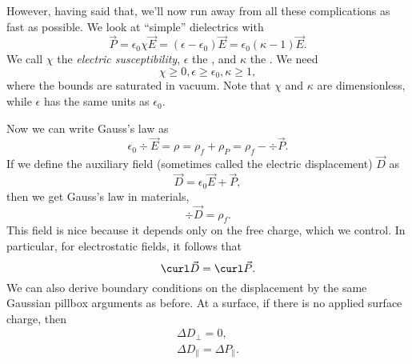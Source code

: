 However, having said that, we'll now run away from all these complications as fast as possible. We look at ``simple'' dielectrics with
\begin{equation}
    \vec P = \epsilon_0 \chi \vec E = (\epsilon- \epsilon_0) \vec E  = \epsilon_0(\kappa -1) \vec E.
\end{equation}
We call $\chi$ the \emph{electric susceptibility}, $\epsilon$ the , and $\kappa$ the . We need
\begin{equation}
    \chi \geq 0, \epsilon \geq \epsilon_0, \kappa \geq 1,
\end{equation}
where the bounds are saturated in vacuum. Note that $\chi$ and $\kappa$ are dimensionless, while $\epsilon$ has the same units as $\epsilon_0$.

Now we can write Gauss's law as
\begin{equation}
    \epsilon_0 \div \vec E = \rho = \rho_f + \rho_P = \rho_f - \div \vec P.
\end{equation}
If we define the auxiliary field (sometimes called the electric displacement) $\vec D$ as
\begin{equation}
    \vec D = \epsilon_0 \vec E +\vec P,
\end{equation}
then we get Gauss's law in materials,
\begin{equation}
    \div \vec D = \rho_f.
\end{equation}
This field is nice because it depends only on the free charge, which we control. In particular, for electrostatic fields, it follows that
\begin{equation}
    \curl \vec D = \curl \vec P.
\end{equation}
We can also derive boundary conditions on the displacement by the same Gaussian pillbox arguments as before. At a surface, if there is no applied surface charge, then
\begin{gather}
    \Delta D_\perp = 0,\\
    \Delta D_\parallel = \Delta P_\parallel.
\end{gather}

